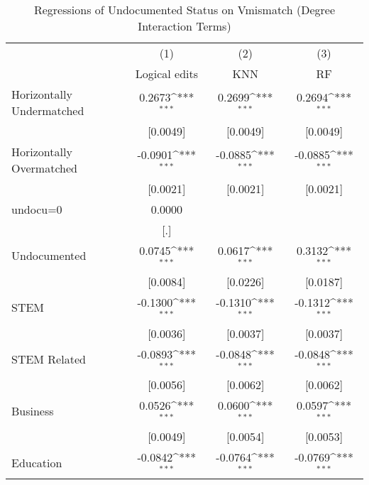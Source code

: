 \begin{table}[htbp]\centering
\def\sym#1{\ifmmode^{#1}\else\(^{#1}\)\fi}
\caption{Regressions of Undocumented Status on Vmismatch (Degree Interaction Terms)}
\begin{tabular}{l*{3}{c}}
\toprule
                    &\multicolumn{1}{c}{(1)}         &\multicolumn{1}{c}{(2)}         &\multicolumn{1}{c}{(3)}         \\
                    &Logical edits         &         KNN         &          RF         \\
\midrule
Horizontally Undermatched&      0.2673\sym{***}&      0.2699\sym{***}&      0.2694\sym{***}\\
                    &    [0.0049]         &    [0.0049]         &    [0.0049]         \\
\addlinespace
Horizontally Overmatched&     -0.0901\sym{***}&     -0.0885\sym{***}&     -0.0885\sym{***}\\
                    &    [0.0021]         &    [0.0021]         &    [0.0021]         \\
\addlinespace
undocu=0            &      0.0000         &                     &                     \\
                    &         [.]         &                     &                     \\
\addlinespace
Undocumented        &      0.0745\sym{***}&      0.0617\sym{***}&      0.3132\sym{***}\\
                    &    [0.0084]         &    [0.0226]         &    [0.0187]         \\
\addlinespace
STEM                &     -0.1300\sym{***}&     -0.1310\sym{***}&     -0.1312\sym{***}\\
                    &    [0.0036]         &    [0.0037]         &    [0.0037]         \\
\addlinespace
STEM Related        &     -0.0893\sym{***}&     -0.0848\sym{***}&     -0.0848\sym{***}\\
                    &    [0.0056]         &    [0.0062]         &    [0.0062]         \\
\addlinespace
Business            &      0.0526\sym{***}&      0.0600\sym{***}&      0.0597\sym{***}\\
                    &    [0.0049]         &    [0.0054]         &    [0.0053]         \\
\addlinespace
Education           &     -0.0842\sym{***}&     -0.0764\sym{***}&     -0.0769\sym{***}\\

\end{tabular}
\end{table}

